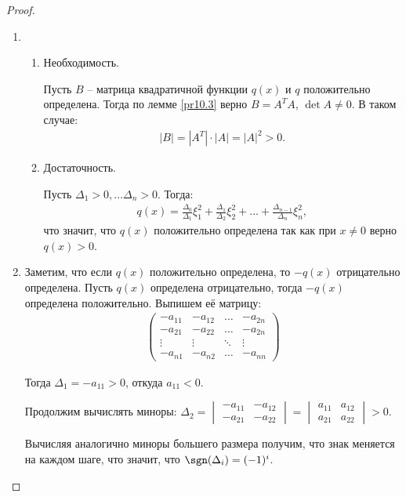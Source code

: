 \begin{proof}~
    \begin{enumerate}
        \item \begin{enumerate}
            \item Необходимость.
            
            Пусть $B$ -- матрица квадратичной функции $q(x)$ и $q$ положительно определена.
            Тогда по лемме \ref{pr10.3} верно $B = A^T A$, $\det A \neq 0$. В таком случае: 
            \begin{gather*}
                |B| = |A^T| \cdot |A| = |A|^2 > 0.
            \end{gather*}
            \item Достаточность.
            
            Пусть $\Delta_1 > 0, \dots \Delta_n > 0$. Тогда: 
            \begin{gather*}
                q(x) = \frac{\Delta_0}{\Delta_1} \xi_1^2 + \frac{\Delta_1}{\Delta_2} \xi_2^2 + \dots + 
                \frac{\Delta_{n-1}}{\Delta_n} \xi_n^2,
            \end{gather*}
            что значит, что $q(x)$ положительно определена так как при $x \neq 0$ верно $q(x) > 0$.
        \end{enumerate}
        \item Заметим, что если $q(x)$ положительно определена, то $-q(x)$ отрицательно определена. Пусть 
        $q(x)$ определена отрицательно, тогда $-q(x)$ определена положительно. Выпишем её матрицу:
        \begin{gather*}
            \begin{pmatrix}
                -a_{11} & -a_{12} & \dots  & -a_{2n} \\
                -a_{21} & -a_{22} & \dots  & -a_{2n} \\
                \vdots  & \vdots  & \ddots & \vdots  \\
                -a_{n1} & -a_{n2} & \dots  & -a_{nn}
            \end{pmatrix}
        \end{gather*}

        Тогда $\Delta_1 = -a_{11} > 0$, откуда $a_{11} < 0$. 
        
        Продолжим вычислять миноры:
        $\Delta_2 = \begin{vmatrix}
        -a_{11} & -a_{12}  \\
        -a_{21} & -a_{22}  
        \end{vmatrix} = \begin{vmatrix}
            a_{11} & a_{12}  \\
            a_{21} & a_{22}  
        \end{vmatrix} > 0$. 
        
        Вычисляя аналогично миноры большего размера получим, 
        что знак меняется на каждом шаге, что значит, что $\sgn(\Delta_i) = (-1)^i$.
    \end{enumerate}
\end{proof}

